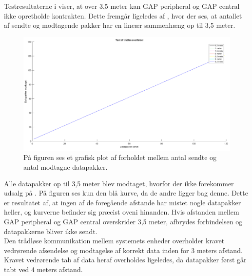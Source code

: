 Testresultaterne i  viser, at over 3,5 meter kan GAP peripheral og GAP central ikke opretholde kontrakten. Dette fremgår ligeledes af , hvor der ses, at antallet af sendte og modtagende pakker har en lineær sammenhæng op til 3,5 meter.
\begin{figure}[H]
	\centering
	\includegraphics[scale=0.45]{figures/cDesign/test_ble.png}
	\caption{På figuren ses et grafisk plot af forholdet mellem antal sendte og antal modtagne datapakker. }
	\label{fig:test_ble}
\end{figure}
Alle datapakker op til 3,5 meter blev modtaget, hvorfor der ikke forekommer udsalg på . På figuren ses kun den blå kurve, da de andre ligger bag denne. %
Dette er resultatet af, at ingen af de foregående afstande har mistet nogle datapakker heller, og kurverne befinder sig præcist oveni hinanden. Hvis afstanden mellem GAP peripheral og GAP central overskrider 3,5 meter, afbrydes forbindelsen og datapakkerne bliver ikke sendt. \\
Den trådløse kommunikation mellem systemets enheder overholder kravet vedrørende afsendelse og modtagelse af korrekt data inden for 3 meters afstand. Kravet vedrørende tab af data heraf overholdes ligeledes, da datapakker først går tabt ved 4 meters afstand.

